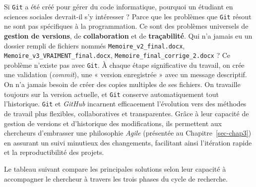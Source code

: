 \documentclass[
  letterpaper,
  DIV=11,
  numbers=noendperiod,
  oneside]{scrreprt}
\begin{document}
Si \texttt{Git} a été créé pour gérer du code informatique, pourquoi un
étudiant en sciences sociales devrait-il s'y intéresser ? Parce que les
problèmes que \texttt{Git} résout ne sont pas spécifiques à la
programmation. Ce sont des problèmes universels de \textbf{gestion de
versions}, de \textbf{collaboration} et de \textbf{traçabilité}. Qui n'a
jamais eu un dossier rempli de fichiers nommés
\texttt{Memoire\_v2\_final.docx},
\texttt{Memoire\_v3\_VRAIMENT\_final.docx},
\texttt{Memoire\_final\_corrige\_2.docx} ? Ce problème n'existe pas avec
\texttt{Git}. À chaque étape significative du travail, on crée une
validation (\emph{commit}), une « version enregistrée » avec un message
descriptif. On n'a jamais besoin de créer des copies multiples de ses
fichiers. On travaille toujours sur la version actuelle, et \texttt{Git}
conserve automatiquement tout l'historique. \texttt{Git} et
\emph{GitHub} incarnent efficacement l'évolution vers des méthodes de
travail plus flexibles, collaboratives et transparentes. Grâce à leur
capacité de gestion de versions et d'historique des modifications, ils
permettent aux chercheurs d'embrasser une philosophie \emph{Agile}
(présentée au Chapitre~\ref{sec-chap3}) en assurant un suivi minutieux
des changements, facilitant ainsi l'itération rapide et la
reproductibilité des projets.

Le tableau suivant compare les principales solutions selon leur capacité
à accompagner le chercheur à travers les trois phases du cycle de
recherche.
\end{document}
